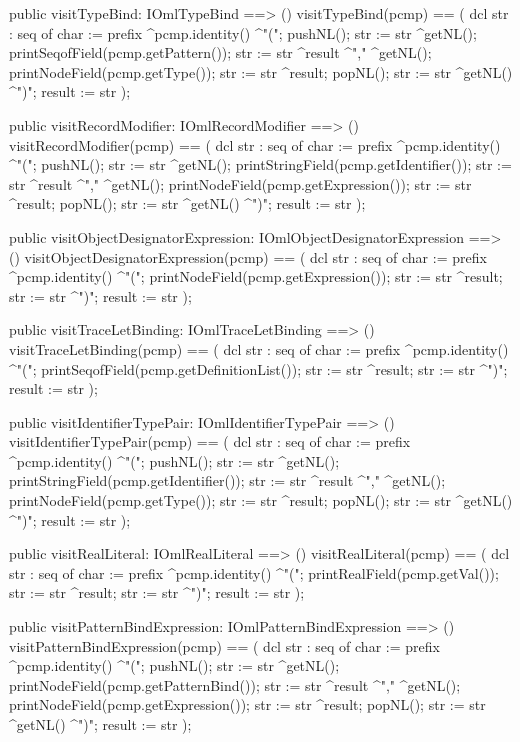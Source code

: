 \begin{vdm_al}
  public visitTypeBind: IOmlTypeBind ==> ()
  visitTypeBind(pcmp) ==
    ( dcl str : seq of char := prefix ^pcmp.identity() ^"(";
      pushNL();
      str := str ^getNL();
      printSeqofField(pcmp.getPattern());
      str := str ^result ^"," ^getNL();
      printNodeField(pcmp.getType());
      str := str ^result;
      popNL();
      str := str ^getNL() ^")";
      result := str );

  public visitRecordModifier: IOmlRecordModifier ==> ()
  visitRecordModifier(pcmp) ==
    ( dcl str : seq of char := prefix ^pcmp.identity() ^"(";
      pushNL();
      str := str ^getNL();
      printStringField(pcmp.getIdentifier());
      str := str ^result ^"," ^getNL();
      printNodeField(pcmp.getExpression());
      str := str ^result;
      popNL();
      str := str ^getNL() ^")";
      result := str );

  public visitObjectDesignatorExpression: IOmlObjectDesignatorExpression ==> ()
  visitObjectDesignatorExpression(pcmp) ==
    ( dcl str : seq of char := prefix ^pcmp.identity() ^"(";
      printNodeField(pcmp.getExpression());
      str := str ^result;
      str := str ^")";
      result := str );

  public visitTraceLetBinding: IOmlTraceLetBinding ==> ()
  visitTraceLetBinding(pcmp) ==
    ( dcl str : seq of char := prefix ^pcmp.identity() ^"(";
      printSeqofField(pcmp.getDefinitionList());
      str := str ^result;
      str := str ^")";
      result := str );

  public visitIdentifierTypePair: IOmlIdentifierTypePair ==> ()
  visitIdentifierTypePair(pcmp) ==
    ( dcl str : seq of char := prefix ^pcmp.identity() ^"(";
      pushNL();
      str := str ^getNL();
      printStringField(pcmp.getIdentifier());
      str := str ^result ^"," ^getNL();
      printNodeField(pcmp.getType());
      str := str ^result;
      popNL();
      str := str ^getNL() ^")";
      result := str );

  public visitRealLiteral: IOmlRealLiteral ==> ()
  visitRealLiteral(pcmp) ==
    ( dcl str : seq of char := prefix ^pcmp.identity() ^"(";
      printRealField(pcmp.getVal());
      str := str ^result;
      str := str ^")";
      result := str );

  public visitPatternBindExpression: IOmlPatternBindExpression ==> ()
  visitPatternBindExpression(pcmp) ==
    ( dcl str : seq of char := prefix ^pcmp.identity() ^"(";
      pushNL();
      str := str ^getNL();
      printNodeField(pcmp.getPatternBind());
      str := str ^result ^"," ^getNL();
      printNodeField(pcmp.getExpression());
      str := str ^result;
      popNL();
      str := str ^getNL() ^")";
      result := str );


\end{vdm_al}
